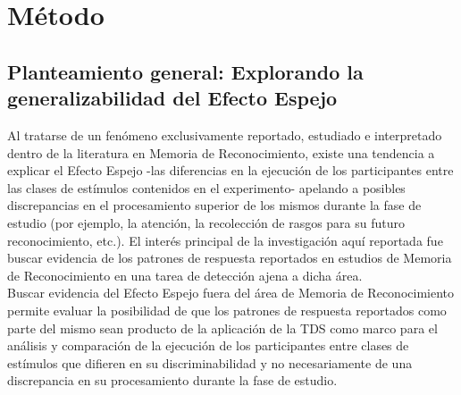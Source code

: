 
\chapter{Método} %

\label{Cap_Exp} %

\section{Planteamiento general: Explorando la generalizabilidad del Efecto Espejo}

Al tratarse de un fenómeno exclusivamente reportado, estudiado e interpretado dentro de la literatura en Memoria de Reconocimiento, existe una tendencia a explicar el Efecto Espejo -las diferencias en la ejecución de los participantes entre las clases de estímulos contenidos en el experimento- apelando a posibles discrepancias en el procesamiento superior de los mismos durante la fase de estudio (por ejemplo, la atención, la recolección de rasgos para su futuro reconocimiento, etc.). El interés principal de la investigación aquí reportada fue buscar evidencia de los patrones de respuesta reportados en estudios de Memoria de Reconocimiento en una tarea de detección ajena a dicha área.\\

Buscar evidencia del Efecto Espejo fuera del área de Memoria de Reconocimiento permite evaluar la posibilidad de que los patrones de respuesta reportados como parte del mismo sean producto de la aplicación de la TDS como marco para el análisis y comparación de la ejecución de los participantes entre clases de estímulos que difieren en su discriminabilidad y no necesariamente de una discrepancia en su procesamiento durante la fase de estudio.\\

